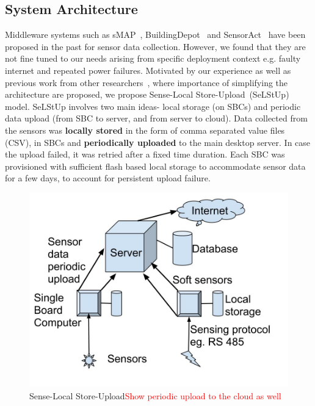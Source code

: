 \documentclass[10pt]{sensys-proc}
\newcommand{\redcolor}[1]{\textcolor{red}{#1}}
\newcommand{\paradigm}{Sense-Local Store-Upload}
\newcommand{\selstup}{SeLStUp}
\newcommand{\paradigms}{Sense-Local Store-Upload~}
\newcommand{\selstups}{SeLStUp }
\begin{document}
\subsection{System Architecture}	
\label{sec:architecture}
Middleware systems such as sMAP~\cite{smap}, BuildingDepot~\cite{buildingdepot} and SensorAct~\cite{Arjunan12} have been proposed in the past for sensor data collection. However, we found that they are not fine tuned to our needs arising from specific deployment context e.g. faulty internet and repeated power failures. Motivated by our experience as well as previous work from other researchers~\cite{hitchhiker_residential}, where importance of simplifying the architecture are proposed, we propose \paradigms (\selstup) model. \selstups involves two main ideas- local storage (on SBCs) and periodic data upload (from SBC to server, and from server to cloud). Data collected from the sensors was \textbf{locally stored} in the form of comma separated value files (CSV), in SBCs and \textbf{periodically uploaded} to the main desktop server. In case the upload failed, it was retried after a fixed time duration. Each SBC was provisioned with sufficient flash based local storage to accommodate sensor data for a few days, to account for persistent upload failure.

\begin{figure} 
\vspace{-4mm}    
    \centering \includegraphics[scale=0.13]{./figures/architecture.jpg}  
    \vspace{-5mm}  
    \caption{\paradigm \redcolor{Show periodic upload to the cloud as well}}   
    \label{fig:architecture}   
\end{figure}
\end{document}
